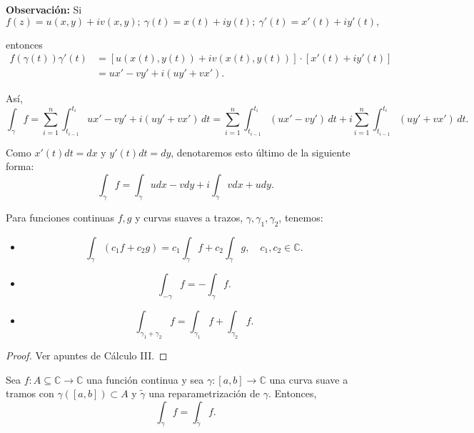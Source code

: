 \textbf{Observación:} Si 
$$f(z) = u(x,y) + iv(x,y); ~ \gamma(t) = x(t) + iy(t); ~ \gamma'(t) = x'(t) + i y'(t),$$

entonces
\begin{align*}
f(\gamma(t)) \gamma'(t) &= [u(x(t), y(t)) + i v(x(t), y(t))] \cdot [x'(t) + i y'(t)] \\
&= u x' - v y' + i(uy'+vx').
\end{align*}

Así, 
\begin{equation*}
\int_{\gamma} f = \sum_{i=1}^n \int_{t_{i-1}}^{t_i} u x' - v y' + i(uy'+vx')\,dt  
= \sum_{i=1}^n \int_{t_{i-1}}^{t_i} (u x' - v y') \,dt + i \sum_{i=1}^n \int_{t_{i-1}}^{t_i} (uy'+vx') \,dt. 
\end{equation*}

Como $x'(t) dt = dx$ y $y'(t) dt = dy$, denotaremos esto último de la siguiente forma:
$$\int_{\gamma} f = \int_{\gamma} udx - vdy + i \int_{\gamma} vdx + udy.$$

\begin{teorema} \label{PropiedadesILinea}
Para funciones continuas $f,g$ y curvas suaves a trazos, $\gamma, \gamma_1, \gamma_2$, tenemos:

\begin{itemize}
\item $$\int_{\gamma} (c_1 f + c_2 g) = c_1 \int_{\gamma} f + c_2 \int_{\gamma} g, \quad c_1,c_2 \in \mathbb{C}.$$

\item $$\int_{-\gamma} f = - \int_{\gamma} f. $$

\item $$\int_{\gamma_1 + \gamma_2} f = \int_{\gamma_1} f + \int_{\gamma_2} f.$$
\end{itemize}
\end{teorema}

\begin{proof}
Ver apuntes de Cálculo III.
\end{proof}

\begin{teorema} \label{IntegralRepara}
Sea $f: A \subseteq \mathbb{C} \longrightarrow \mathbb{C}$ una función continua y sea $\gamma: [a,b] \longrightarrow \mathbb{C}$ una curva suave a tramos con $\gamma([a,b]) \subset A$ y $\tilde{\gamma}$ una reparametrización de $\gamma$. Entonces,
$$\int_{\gamma} f =  \int_{\tilde{\gamma}} f.$$

\end{teorema}

